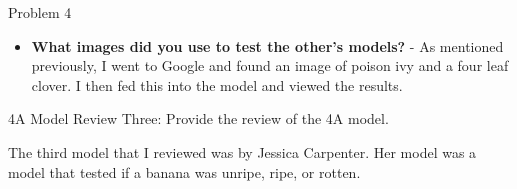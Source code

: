 \begin{problem}{Problem 4}
\begin{Highlight}[Solution]
\begin{spacing}{1.50}
\begin{itemize}
                at determining if something is poison ivy or not. So because of this, I would say that this model does something that most humans cannot do.
                \item \textbf{What images did you use to test the other's models?} - As mentioned previously, I went to Google and found an image of poison ivy and a four leaf clover. I then fed this into the
                model and viewed the results.
            \end{itemize}
        \end{spacing}
        \vspace*{-0.5em}
    \end{Highlight}
    
    \clearpage
    \begin{statement}{4A Model Review Three:}
        Provide the review of the 4A model.
    \end{statement}
    
    \begin{Highlight}[Solution]
        \begin{spacing}{1.50}
            The third model that I reviewed was by Jessica Carpenter. Her model was a model that tested if a banana was unripe, ripe, or rotten.


\end{spacing}
\end{Highlight}
\end{problem}
